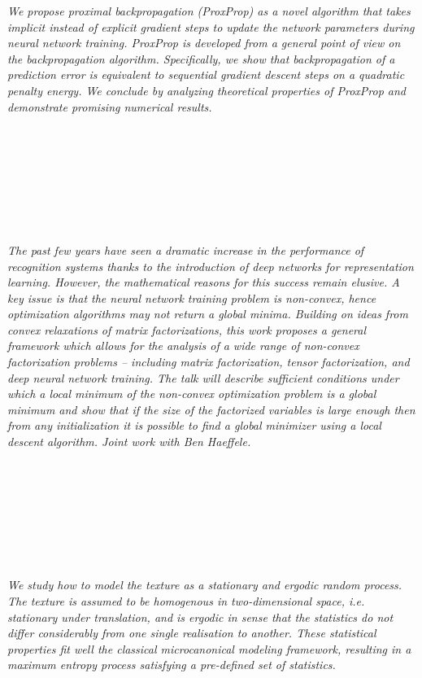 \begin{multicols}{2}
      \textit{We propose proximal backpropagation (ProxProp) as a novel algorithm that takes implicit instead of explicit gradient steps to update the network parameters during neural network training. ProxProp is developed from a general point of view on the backpropagation algorithm. Specifically, we show that backpropagation of a prediction error is equivalent to sequential gradient descent steps on a quadratic penalty energy. We conclude by analyzing theoretical properties of ProxProp and demonstrate promising numerical results.}\\
\\ 
        \\
        \\\\
        \\
        \\\\
\\
      \textit{The past few years have seen a dramatic increase in the performance of recognition systems thanks to the introduction of deep networks for representation learning. However, the mathematical reasons for this success remain elusive. A key issue is that the neural network training problem is non-convex, hence optimization algorithms may not return a global minima. Building on ideas from convex relaxations of matrix factorizations, this work proposes a general framework which allows for the analysis of a wide range of non-convex factorization problems – including matrix factorization, tensor factorization, and deep neural network training. The talk will describe sufficient conditions under which a local minimum of the non-convex optimization problem is a global minimum and show that if the size of the factorized variables is large enough then from any initialization it is possible to find a global minimizer using a local descent algorithm. Joint work with Ben Haeffele.}\\
\\ 
        \\
        \\\\
        \\
        \\\\
\\
      \textit{We study how to model the texture as a stationary and ergodic random process. The texture is assumed to be homogenous in two-dimensional space, i.e. stationary under translation, and is ergodic in sense that the statistics do not differ considerably from one single realisation to another. These statistical properties fit well the classical microcanonical modeling framework, resulting in a maximum entropy process satisfying a pre-defined set of statistics.
}
\end{multicols}
